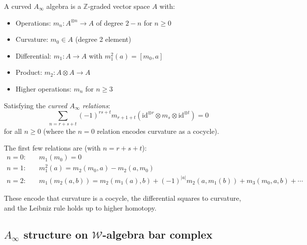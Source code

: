 \begin{definition}\label{def:curved-ainfty-w}
A curved $A_\infty$ algebra is a $\mathbb{Z}$-graded vector space $A$ with:
\begin{itemize}
\item Operations: $m_n: A^{\otimes n} \to A$ of degree $2-n$ for $n \geq 0$
\item Curvature: $m_0 \in A$ (degree 2 element)
\item Differential: $m_1: A \to A$ with $m_1^2(a) = [m_0, a]$
\item Product: $m_2: A \otimes A \to A$ 
\item Higher operations: $m_n$ for $n \geq 3$
\end{itemize}

Satisfying the \emph{curved $A_\infty$ relations}:
\begin{equation}
\sum_{n=r+s+t} (-1)^{rs+t} m_{r+1+t}(\mathrm{id}^{\otimes r} \otimes m_s \otimes \mathrm{id}^{\otimes t}) = 0
\end{equation}
for all $n \geq 0$ (where the $n=0$ relation encodes curvature as a cocycle).
\end{definition}

\begin{remark}
The first few relations are (with $n = r+s+t$):
\begin{align}
n=0: \quad &m_1(m_0) = 0 \\
n=1: \quad &m_1^2(a) = m_2(m_0, a) - m_2(a, m_0) \\
n=2: \quad &m_1(m_2(a,b)) = m_2(m_1(a),b) + (-1)^{|a|}m_2(a,m_1(b)) + m_3(m_0,a,b) + \cdots
\end{align}

These encode that curvature is a cocycle, the differential squares to curvature, and the Leibniz rule holds up to higher homotopy.
\end{remark}

\subsection{\texorpdfstring{$A_\infty$ structure on $\mathcal{W}$-algebra bar complex}{A infty structure on $\mathcal{W}$-algebra bar complex}}

